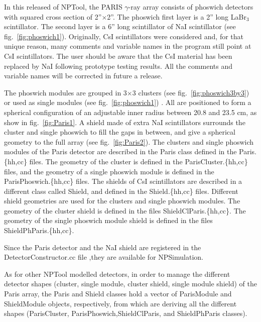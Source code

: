\documentclass[a4paper,12pt]{article}
\begin{document}
In this released of NPTool, the PARIS $\gamma$-ray array consists of phoswich detectors 
with squared cross section of 2''$\times$2''. The phoswich first layer is a 2'' long 
LaBr$_{3}$ scintillator. The second layer is a 6'' long scintillator of NaI scintillator 
(see fig.~\ref{fig:phoswich1}). Originally, CsI scintillators were considered and, for 
that unique reason, many comments and variable names in the program still point at CsI 
scintillators. The user should be aware that the CsI material has been replaced by NaI 
following prototype testing results. All the comments and variable names will be 
corrected in future a release. 
  
 The phoswich modules are grouped in 3$\times$3 clusters (see fig.~\ref{fig:phoswich3by3})  
or used as single modules (see fig.~\ref{fig:phoswich1}) . All are positioned to form a 
spherical configuration of an adjustable inner radius between 20.8 and 23.5 cm, as show in 
fig.~\ref{fig:Paris1}. A shield made of extra NaI scintillators surrounds the cluster and 
single phoswich to fill the gaps in between, and give a spherical geometry to the full array 
(see fig.~\ref{fig:Paris2}). The clusters and single phoswich modules of the Paris detector 
are described in the Paris class defined in the Paris.\{hh,cc\} files. The geometry of the 
cluster is defined in the ParisCluster.\{hh,cc\} files, and the geometry of a single phoswich
module is defined in the ParisPhoswich.\{hh,cc\} files.
The shields of CsI scintillators are described in a different class called Shield, and 
defined in the Shield.\{hh,cc\} files. Different shield geometries are used for the clusters 
and single phoswich modules. The geometry of the cluster shield is defined in the files 
ShieldClParis.\{hh,cc\}. The geometry of the single phoswich module shield is defined in the 
files ShieldPhParis.\{hh,cc\}.

\begin{figure*}[ht]
\begin{center}
\end{center}
\caption{Two drawings of a 3$\times$3 cluster. The LaBr$_{3}$ scintillator is in blue and 
the NaI scintillator is in red } 
\label{fig:phoswich3by3}
\end{figure*}
  
Since the Paris detector and the NaI shield are registered in the DetectorConstructor.cc file
,they are available for NPSimulation.

As for other NPTool modelled detectors, in order to manage the different detector shapes 
(cluster, single module, cluster shield, single module shield) of the Paris array, the Paris 
and Shield classes hold a vector of ParisModule and ShieldModule objects, respectively, from 
which are deriving all the different shapes (ParisCluster, ParisPhoswich,ShieldClParis, and 
ShieldPhParis classes).
\end{document}
